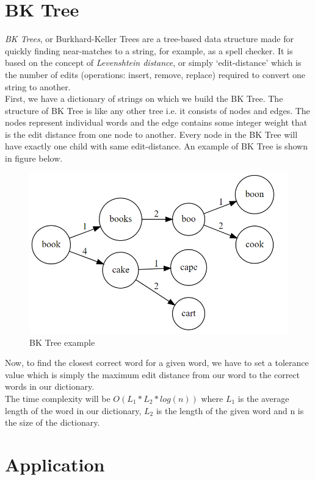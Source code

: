 \documentclass[11pt,a4paper]{article}
\begin{document}
\section{BK Tree}
\label{sec:bktree}
\emph{BK Trees}, or Burkhard-Keller Trees are a tree-based data structure made for quickly finding near-matches to a string, for example, as a spell checker. It is based on the concept of \emph{Levenshtein distance}, or simply `edit-distance' which is the number of edits (operations: insert, remove, replace) required to convert one string to another.
\\
First, we have a dictionary of strings on which we build the BK Tree. The structure of BK Tree is like any other tree i.e. it consists of nodes and edges. The nodes represent individual words and the edge contains some integer weight that is the edit distance from one node to another. Every node in the BK Tree will have exactly one child with same edit-distance. An example of BK Tree is shown in figure below.
\begin{figure}[H]
    \centering
    \includegraphics{Images/image2.png}
    \caption{BK Tree example}
    \label{fig:bktreeExample}
\end{figure}
Now, to find the closest correct word for a given word, we have to set a tolerance value which is simply the maximum edit distance from our word to the correct words in our dictionary.
\\
The time complexity will be $O(L_1*L_2*log(n))$ where $L_1$ is the average length of the word in our dictionary, $L_2$ is the length of the given word and n is the size of the dictionary.

\section*{Application}
\end{document}
